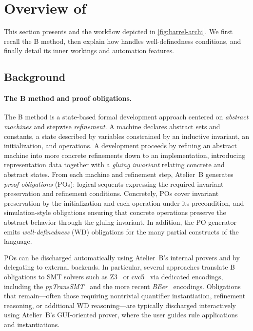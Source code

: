 \section{Overview of \barrel}

This section presents \barrel and the workflow depicted in \cref{fig:barrel-archi}.
We first recall the B method, then explain how \barrel handles well-definedness conditions, and finally detail its inner workings and automation features.

\subsection{Background}

\paragraph*{The B method and proof obligations.}
The B method is a state-based formal development approach centered on \emph{abstract machines} and stepwise \emph{refinement}.
A machine declares abstract sets and constants, a state described by variables constrained by an inductive invariant, an initialization, and operations.
A development proceeds by refining an abstract machine into more concrete refinements down to an implementation, introducing representation data together with a \emph{gluing invariant} relating concrete and abstract states.
From each machine and refinement step, Atelier~B generates \emph{proof obligations} (POs): logical sequents expressing the required invariant-preservation and refinement conditions.
Concretely, POs cover invariant preservation by the initialization and each operation under its precondition, and simulation-style obligations ensuring that concrete operations preserve the abstract behavior through the gluing invariant.
In addition, the PO generator emits \emph{well-definedness} (WD) obligations for the many partial constructs of the language.

POs can be discharged automatically using Atelier~B’s internal provers and by delegating to external backends.
In particular, several approaches translate B obligations to SMT solvers such as Z3~\cite{z3} or cvc5~\cite{cvc5} via dedicated encodings, including the \emph{ppTransSMT}~\cite{DeharbeBSMT} and the more recent \emph{BEer}~\cite{beer} encodings.
Obligations that remain---often those requiring nontrivial quantifier instantiation, refinement reasoning, or additional WD reasoning---are typically discharged interactively using Atelier~B’s GUI-oriented prover, where the user guides rule applications and instantiations.

